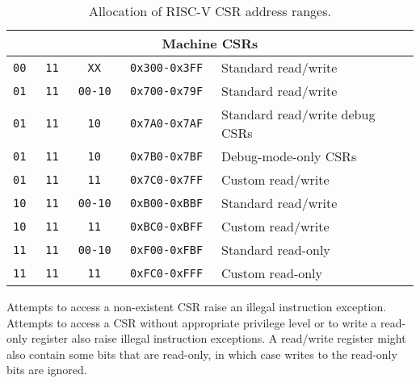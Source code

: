 \begin{table*}[h!]
\begin{center}
\begin{tabular}{|c|c|c|c|l|}
\hline
\multicolumn{5}{|c|}{Machine CSRs}  \\
\hline                                         
\tt   00   &\tt   11  &\tt   XX     & \tt 0x300-0x3FF & Standard read/write \\ 
\tt   01   &\tt   11  &\tt   00-10  & \tt 0x700-0x79F & Standard read/write \\ 
\tt   01   &\tt   11  &\tt   10     & \tt 0x7A0-0x7AF & Standard read/write debug CSRs  \\ 
\tt   01   &\tt   11  &\tt   10     & \tt 0x7B0-0x7BF & Debug-mode-only CSRs \\
\tt   01   &\tt   11  &\tt   11     & \tt 0x7C0-0x7FF & Custom read/write \\ 
\tt   10   &\tt   11  &\tt   00-10  & \tt 0xB00-0xBBF & Standard read/write \\ 
\tt   10   &\tt   11  &\tt   11     & \tt 0xBC0-0xBFF & Custom read/write \\ 
\tt   11   &\tt   11  &\tt   00-10  & \tt 0xF00-0xFBF & Standard read-only \\
\tt   11   &\tt   11  &\tt   11     & \tt 0xFC0-0xFFF & Custom read-only \\
\hline
\end{tabular}
\end{center}
\caption{Allocation of RISC-V CSR address ranges.}
\label{csrrwpriv}
\end{table*}

Attempts to access a non-existent CSR raise an illegal instruction
exception.  Attempts to access a CSR without appropriate privilege
level or to write a read-only register also raise illegal instruction
exceptions.  A read/write register might also contain some bits that
are read-only, in which case writes to the read-only bits are ignored.

